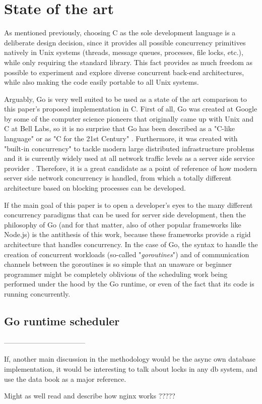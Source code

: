 \section{State of the art}
As mentioned previously, choosing C as the sole development language is a deliberate design decision, since it provides all possible concurrency primitives natively in Unix systems (threads, message queues, processes, file locks, etc.), while only requiring the standard library. This fact provides as much freedom as possible to experiment and explore diverse concurrent back-end architectures, while also making the code easily portable to all Unix systems.

Arguably, Go is very well suited to be used as a state of the art comparison to this paper's proposed implementation in C. First of all, Go was created at Google by some of the computer science pioneers that originally came up with Unix and C at Bell Labs, so it is no surprise that Go has been described as a "C-like language" or as "C for the 21st Century" \cite{GoPL2015}. Furthermore, it was created with "built-in concurrency" to tackle modern large distributed infrastructure problems and it is currently widely used at all network traffic levels as a server side service provider \cite{Pike2012}. Therefore, it is a great candidate as a point of reference of how modern server side network concurrency is handled, from which a totally different architecture based on blocking processes can be developed. 

If the main goal of this paper is to open a developer's eyes to the many different concurrency paradigms that can be used for server side development, then the philosophy of Go (and for that matter, also of other popular frameworks like Node.js) is the antithesis of this work, because these frameworks provide a rigid architecture that handles concurrency. In the case of Go, the syntax to handle the creation of concurrent workloads (so-called "\textit{goroutines}") and of communication channels between the goroutines is so simple that an unaware or beginner programmer might be completely oblivious of the scheduling work being performed under the hood by the Go runtime, or even of the fact that its code is running concurrently. 

\subsection{Go runtime scheduler}

-----------------------------------

If, another main discussion in the methodology would be the async own database implementation, it would be interesting to talk about locks in any db system, and use the data book as a major reference.

Might as well read and describe how nginx works ?????
